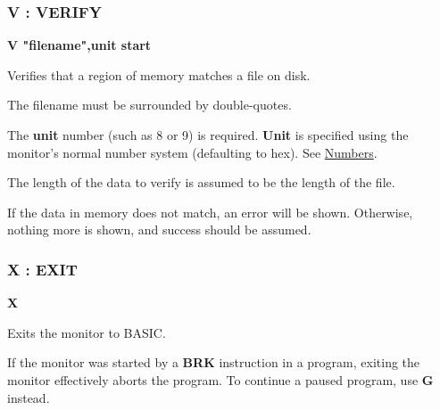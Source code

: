 \subsubsection{V : VERIFY}
\begin{description}[leftmargin=2cm,style=nextline]
\item [Format:] {\bf V "filename",unit start}
\item [Usage:] Verifies that a region of memory matches a file on disk.

\item [Remarks:] The filename must be surrounded by double-quotes.

    The {\bf unit} number (such as 8 or 9) is required. {\bf Unit} is specified using the monitor's normal number system (defaulting to hex). See \hyperref[sec:numbers]{Numbers}.

    The length of the data to verify is assumed to be the length of the file.

    If the data in memory does not match, an error will be shown.  Otherwise, nothing more is shown, and success should be assumed.

\end{description}


\subsubsection{X : EXIT}
\begin{description}[leftmargin=2cm,style=nextline]
\item [Format:] {\bf X}
\item [Usage:] Exits the monitor to BASIC.

\item [Remarks:] If the monitor was started by a {\bf BRK} instruction in a program, exiting the monitor effectively aborts the program. To continue a paused program, use {\bf G} instead.

\end{description}


